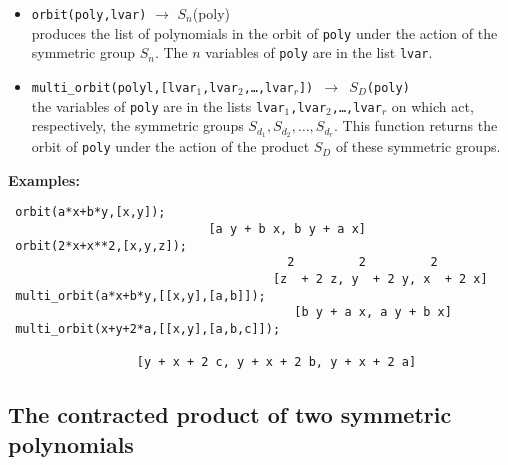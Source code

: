 \documentclass[11pt]{article}
\begin{document}
\begin{itemize}
  \item \texttt{orbit(poly,lvar)} 
    $\longrightarrow$ $S_n$(poly) \\
    produces the list of polynomials in the orbit of \texttt{poly}
    under the action of the symmetric group $S_n$. The $n$ variables of
    \texttt{poly} are in the list \texttt{lvar}.
  \item \texttt{multi\_orbit(polyl,[lvar$_{1}$,lvar$_{2}$,\ldots ,lvar$_{r}$])
      $\longrightarrow$ ${S_D}$(poly) }\\
    the variables of \texttt{poly} are in the lists
    \texttt{lvar$_1$,lvar$_{2}$,\ldots ,lvar$_{r}$} on which act, respectively,
    the symmetric groups $S_{d_1},S_{d_2},\ldots ,S_{d_r}$.  This function
    returns the orbit of \texttt{poly} under the action of the product $S_D$ of
    these symmetric groups.
\end{itemize}
\textbf{Examples:}
\small
\begin{verbatim}
 orbit(a*x+b*y,[x,y]);
                            [a y + b x, b y + a x]
 orbit(2*x+x**2,[x,y,z]);
                                       2         2         2
                                     [z  + 2 z, y  + 2 y, x  + 2 x]
 multi_orbit(a*x+b*y,[[x,y],[a,b]]);
                                        [b y + a x, a y + b x]
 multi_orbit(x+y+2*a,[[x,y],[a,b,c]]);
 
                  [y + x + 2 c, y + x + 2 b, y + x + 2 a]
\end{verbatim}
\normalsize


\subsection{The contracted product of two symmetric polynomials}
\end{document}
